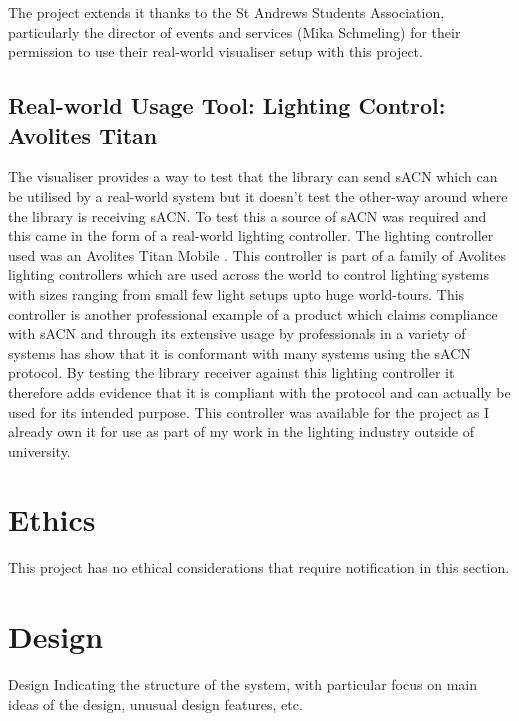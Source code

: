 \documentclass[11pt,a4paper]{report}
\begin{document}
The project extends it thanks to the St Andrews Students Association, particularly the director of events and services (Mika Schmeling) for their permission to use their real-world visualiser setup with this project.

\subsection{Real-world Usage Tool: Lighting Control: Avolites Titan}
The visualiser provides a way to test that the library can send sACN which can be utilised by a real-world system but it doesn't test the other-way around where the library is receiving sACN. To test this a source of sACN was required and this came in the form of a real-world lighting controller. The lighting controller used was an Avolites Titan Mobile \cite{AVO_TITAN_MOBILE}. This controller is part of a family of Avolites lighting controllers which are used across the world to control lighting systems with sizes ranging from small few light setups upto huge world-tours. This controller is another professional example of a product which claims compliance with sACN and through its extensive usage by professionals in a variety of systems has show that it is conformant with many systems using the sACN protocol. By testing the library receiver against this lighting controller it therefore adds evidence that it is compliant with the protocol and can actually be used for its intended purpose. This controller was available for the project as I already own it for use as part of my work in the lighting industry outside of university. 

\section{Ethics}
This project has no ethical considerations that require notification in this section.

\section{Design}
Design
Indicating the structure of the system, with particular
focus on main ideas of the design, unusual design
features, etc.
\end{document}

